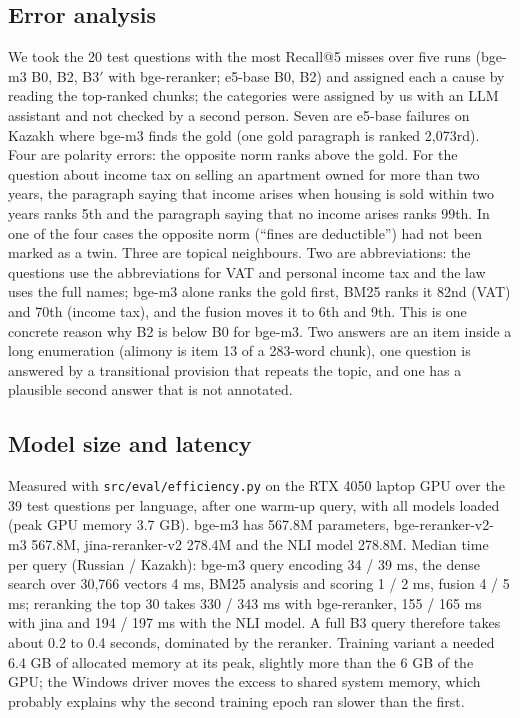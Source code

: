 \documentclass[11pt]{article}
\begin{document}
\subsection{Error analysis}
We took the 20 test questions with the most Recall@5 misses over five runs (bge-m3 B0, B2, B3$'$ with
bge-reranker; e5-base B0, B2) and assigned each a cause by reading the top-ranked chunks; the categories were
assigned by us with an LLM assistant and not checked by a second person. Seven are e5-base
failures on Kazakh where bge-m3 finds the gold (one gold paragraph is ranked 2,073rd). Four are polarity
errors: the opposite norm ranks above the gold. For the question about income tax on selling an apartment owned
for more than two years, the paragraph saying that income arises when housing is sold within two years ranks
5th and the paragraph saying that no income arises ranks 99th. In one of the four cases the opposite norm
(``fines are deductible'') had not been marked as a twin. Three are topical neighbours. Two are abbreviations:
the questions use the abbreviations for VAT and personal income tax and the law uses the full names; bge-m3
alone ranks the gold first, BM25 ranks it 82nd (VAT) and 70th (income tax), and the fusion moves it to 6th
and 9th. This is one
concrete reason why B2 is below B0 for bge-m3. Two answers are an item inside a long enumeration (alimony is
item 13 of a 283-word chunk), one question is answered by a transitional provision that repeats the topic, and
one has a plausible second answer that is not annotated.

\subsection{Model size and latency}
Measured with \texttt{src/eval/efficiency.py} on the RTX 4050 laptop GPU over the 39 test questions per language,
after one warm-up query, with all models loaded (peak GPU memory 3.7 GB). bge-m3 has 567.8M parameters,
bge-reranker-v2-m3 567.8M, jina-reranker-v2 278.4M and the NLI model 278.8M. Median time per query (Russian /
Kazakh): bge-m3 query encoding 34 / 39 ms, the dense search over 30,766 vectors 4 ms, BM25 analysis and scoring
1 / 2 ms, fusion 4 / 5 ms; reranking the top 30 takes 330 / 343 ms with bge-reranker, 155 / 165 ms with jina and
194 / 197 ms with the NLI model. A full B3 query therefore takes about 0.2 to 0.4 seconds, dominated by the
reranker. Training variant a needed 6.4 GB of allocated memory at its peak, slightly more than the 6 GB of the GPU;
the Windows driver moves the excess to shared system memory, which probably explains why the second training
epoch ran slower than the first.
\end{document}
